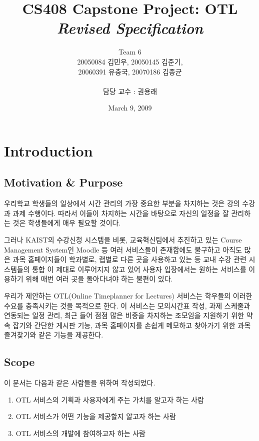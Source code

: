 \documentclass[a4paper,titlepage]{article}
\title{\textbf{CS408 Capstone Project: OTL}\\ \textit{Revised Specification}}
\author{Team 6\\20050084 김민우, 20050145 김준기,\\20060391 유충국, 20070186 김종균\\\\담당 교수 : 권용래}
\begin{document}
\date{March 9, 2009}
\maketitle

\tableofcontents
\listoffigures

\pagebreak

\section{Introduction}
\subsection{Motivation \& Purpose}
우리학교 학생들의 일상에서 시간 관리의 가장 중요한 부분을 차지하는 것은 강의 수강과 과제 수행이다.
따라서 이들이 차지하는 시간을 바탕으로 자신의 일정을 잘 관리하는 것은 학생들에게 매우 필요할 것이다. 

그러나 KAIST의 수강신청 시스템을 비롯, 교육혁신팀에서 추진하고 있는 Course Management System인 Moodle 등 여러 서비스들이 존재함에도 불구하고 아직도 많은 과목 
홈페이지들이 학과별로, 랩별로 다른 곳을 사용하고 있는 등 교내 수강 관련 시스템들의 통합 이 제대로 이루어지지 않고 있어 사용자 입장에서는 원하는 서비스를 이용하기 위해 매번 여러 곳을 돌아다녀야 하는 불편이 있다. 

우리가 제안하는 OTL(Online Timeplanner for Lectures) 서비스는 학우들의 이러한 수요를 충족시키는 것을 목적으로 한다.
이 서비스는 모의시간표 작성, 과제 스케줄과 연동되는 일정 관리, 최근 들어 점점 많은 비중을 차지하는 조모임을 지원하기 위한 약속 잡기와 간단한 게시판 기능, 과목 홈페이지를 손쉽게 메모하고 찾아가기 위한 과목 즐겨찾기와 같은 기능을 제공한다.

\subsection{Scope}
이 문서는 다음과 같은 사람들을 위하여 작성되었다.
\begin{enumerate}
	\item OTL 서비스의 기획과 사용자에게 주는 가치를 알고자 하는 사람
	\item OTL 서비스가 어떤 기능을 제공할지 알고자 하는 사람
	\item OTL 서비스의 개발에 참여하고자 하는 사람
\end{enumerate}
\end{document}
